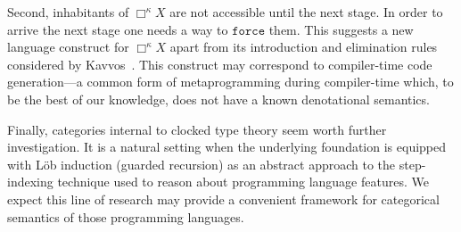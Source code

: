 \documentclass[a4paper,UKenglish,numberwithinsect,cleveref,thm-restate]{lipics-v2021}
\numberwithin{equation}{section}
\theoremstyle{plain}
\begin{document}
Second, inhabitants of $\Box^\kappa X$ are not accessible until the next stage. In order to arrive the next stage one needs a way to $\mathtt{force}$ them. 
This suggests a new language construct for $\Box^\kappa X$ apart from its introduction and elimination rules considered by Kavvos~\cite{Kavvos2017a}.
This construct may correspond to compiler-time code generation---a common form of metaprogramming during compiler-time which, to be the best of our knowledge, does not have a known denotational semantics.


Finally, categories internal to clocked type theory seem worth further investigation.
It is a natural setting when the underlying foundation is equipped with Löb induction (guarded recursion) as an abstract approach to the step-indexing technique used to reason about programming language features.
We expect this line of research may provide a convenient framework for categorical semantics of those programming languages.


%
%  



\appendix
\end{document}
